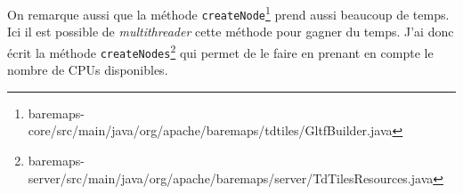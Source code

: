 On remarque aussi que la méthode \texttt{createNode}\footnote{baremaps-core/src/main/java/org/apache/baremaps/tdtiles/GltfBuilder.java} prend aussi beaucoup de temps. Ici il est possible de \textit{multithreader} cette méthode pour gagner du temps. J'ai donc écrit la méthode \texttt{createNodes}\footnote{baremaps-server/src/main/java/org/apache/baremaps/server/TdTilesResources.java} qui permet de le faire en prenant en compte le nombre de CPUs disponibles.

\newpage